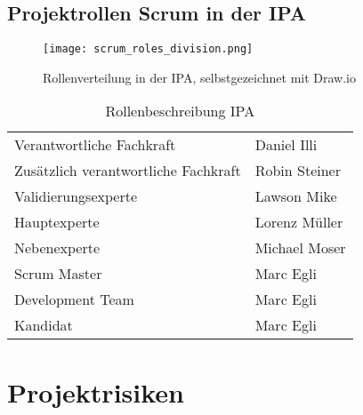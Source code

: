 \newpage

\section{Projektrollen Scrum in der IPA}

\begin{figure}[h]
    \centering
    \texttt{[image: scrum\_roles\_division.png]}
    \caption{Rollenverteilung in der IPA, selbstgezeichnet mit Draw.io}
\end{figure}

\begin{table}[h!]
    \begin{tabular}{|L{0.4\textwidth}|L{0.5\textwidth}|}
        \hline
          \\[12pt]
        \hline
        Verantwortliche Fachkraft & Daniel Illi  \\
        \hline
        Zusätzlich verantwortliche Fachkraft & Robin Steiner \\
        \hline
        Validierungsexperte & Lawson Mike \\ 
        \hline
        Hauptexperte & Lorenz Müller \\ 
        \hline
        Nebenexperte & Michael Moser \\ 
        \hline
        Scrum Master & Marc Egli \\ 
        \hline
        Development Team & Marc Egli \\ 
        \hline
        Kandidat & Marc Egli \\ 
        \hline
      \end{tabular}
      \caption{Rollenbeschreibung IPA}
\end{table}

\newpage

\storeareas\riskvaluesproject
{}
\areaset
  {\dimexpr\the\paperwidth-1cm\relax}
  {\dimexpr\the\paperheight-5.5cm\relax}
\recalctypearea

\chapter{Projektrisiken}

